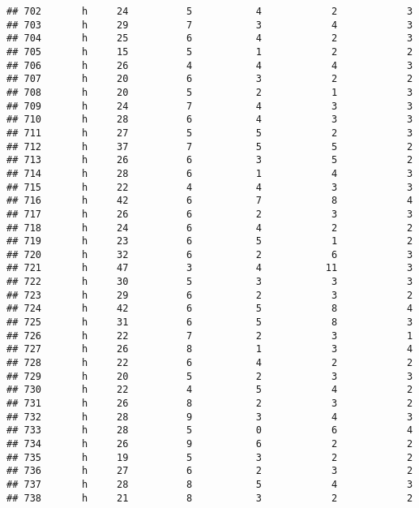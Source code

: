 \documentclass[
]{article}
\begin{document}
\begin{verbatim}
## 702       h     24          5           4            2            3
## 703       h     29          7           3            4            3
## 704       h     25          6           4            2            3
## 705       h     15          5           1            2            2
## 706       h     26          4           4            4            3
## 707       h     20          6           3            2            2
## 708       h     20          5           2            1            3
## 709       h     24          7           4            3            3
## 710       h     28          6           4            3            3
## 711       h     27          5           5            2            3
## 712       h     37          7           5            5            2
## 713       h     26          6           3            5            2
## 714       h     28          6           1            4            3
## 715       h     22          4           4            3            3
## 716       h     42          6           7            8            4
## 717       h     26          6           2            3            3
## 718       h     24          6           4            2            2
## 719       h     23          6           5            1            2
## 720       h     32          6           2            6            3
## 721       h     47          3           4           11            3
## 722       h     30          5           3            3            3
## 723       h     29          6           2            3            2
## 724       h     42          6           5            8            4
## 725       h     31          6           5            8            3
## 726       h     22          7           2            3            1
## 727       h     26          8           1            3            4
## 728       h     22          6           4            2            2
## 729       h     20          5           2            3            3
## 730       h     22          4           5            4            2
## 731       h     26          8           2            3            2
## 732       h     28          9           3            4            3
## 733       h     28          5           0            6            4
## 734       h     26          9           6            2            2
## 735       h     19          5           3            2            2
## 736       h     27          6           2            3            2
## 737       h     28          8           5            4            3
## 738       h     21          8           3            2            2

\end{verbatim}
\end{document}
